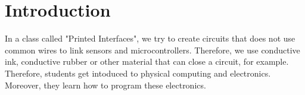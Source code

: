 
    \section{Introduction}
    \begin{flushleft}
        In a class called "Printed Interfaces", we try to create circuits that does not use common wires 
        to link sensors and microcontrollers. Therefore, we use conductive ink, conductive rubber or other
        material that can close a circuit, for example. Therefore, students get intoduced to physical 
        computing and electronics. Moreover, they learn how to program these electronics. 
    \end{flushleft}
